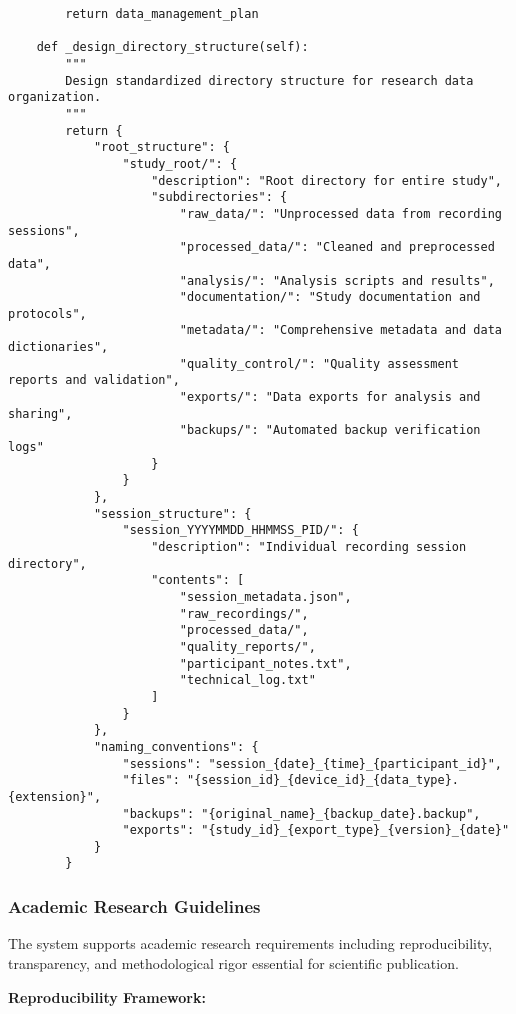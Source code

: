 \documentclass[11pt,a4paper]{article}
\begin{document}
\begin{verbatim}
        return data_management_plan

    def _design_directory_structure(self):
        """
        Design standardized directory structure for research data organization.
        """
        return {
            "root_structure": {
                "study_root/": {
                    "description": "Root directory for entire study",
                    "subdirectories": {
                        "raw_data/": "Unprocessed data from recording sessions",
                        "processed_data/": "Cleaned and preprocessed data",
                        "analysis/": "Analysis scripts and results",
                        "documentation/": "Study documentation and protocols",
                        "metadata/": "Comprehensive metadata and data dictionaries",
                        "quality_control/": "Quality assessment reports and validation",
                        "exports/": "Data exports for analysis and sharing",
                        "backups/": "Automated backup verification logs"
                    }
                }
            },
            "session_structure": {
                "session_YYYYMMDD_HHMMSS_PID/": {
                    "description": "Individual recording session directory",
                    "contents": [
                        "session_metadata.json",
                        "raw_recordings/",
                        "processed_data/",
                        "quality_reports/",
                        "participant_notes.txt",
                        "technical_log.txt"
                    ]
                }
            },
            "naming_conventions": {
                "sessions": "session_{date}_{time}_{participant_id}",
                "files": "{session_id}_{device_id}_{data_type}.{extension}",
                "backups": "{original_name}_{backup_date}.backup",
                "exports": "{study_id}_{export_type}_{version}_{date}"
            }
        }
\end{verbatim}

\subsubsection{Academic Research Guidelines}

The system supports academic research requirements including reproducibility, transparency, and methodological rigor
essential for scientific publication.

\textbf{Reproducibility Framework:}
\end{document}
